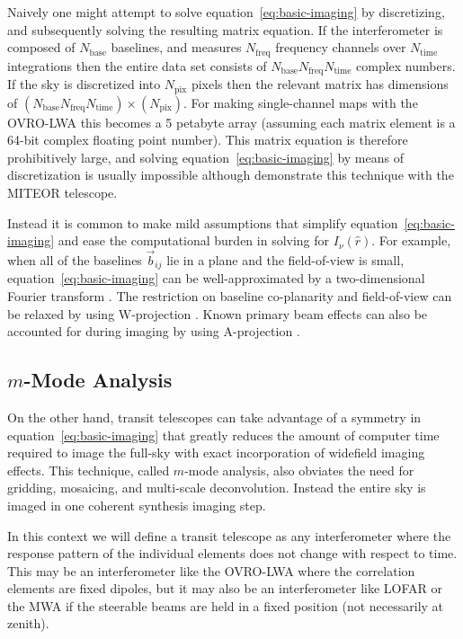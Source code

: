 \documentclass[twocolumn]{aastex6}
\begin{document}
Naively one might attempt to solve equation~\ref{eq:basic-imaging} by discretizing, and subsequently
solving the resulting matrix equation. If the interferometer is composed of $N_\text{base}$
baselines, and measures $N_\text{freq}$ frequency channels over $N_\text{time}$ integrations then
the entire data set consists of $N_\text{base}N_\text{freq}N_\text{time}$ complex numbers. If the
sky is discretized into $N_\text{pix}$ pixels then the relevant matrix has dimensions of
$(N_\text{base}N_\text{freq}N_\text{time})\times(N_\text{pix})$. For making single-channel maps with
the OVRO-LWA this becomes a 5 petabyte array (assuming each matrix element is a 64-bit complex
floating point number).  This matrix equation is therefore prohibitively large, and solving
equation~\ref{eq:basic-imaging} by means of discretization is usually impossible although
\citet{2017MNRAS.465.2901Z} demonstrate this technique with the MITEOR telescope.

Instead it is common to make mild assumptions that simplify equation~\ref{eq:basic-imaging} and ease
the computational burden in solving for $I_\nu(\hat r)$. For example, when all of the baselines
$\vec b_{ij}$ lie in a plane and the field-of-view is small, equation~\ref{eq:basic-imaging} can be
well-approximated by a two-dimensional Fourier transform \citep{2001isra.book.....T}. The
restriction on baseline co-planarity and field-of-view can be relaxed by using W-projection
\citep{2008ISTSP...2..647C}. Known primary beam effects can also be accounted for during imaging by
using A-projection \citep{2013ApJ...770...91B}.

\subsection{$m$-Mode Analysis}

On the other hand, transit telescopes can take advantage of a symmetry in
equation~\ref{eq:basic-imaging} that greatly reduces the amount of computer time required to image
the full-sky with exact incorporation of widefield imaging effects. This technique, called $m$-mode
analysis, also obviates the need for gridding, mosaicing, and multi-scale deconvolution. Instead the
entire sky is imaged in one coherent synthesis imaging step.

In this context we will define a transit telescope as any interferometer where the response pattern
of the individual elements does not change with respect to time. This may be an interferometer like
the OVRO-LWA where the correlation elements are fixed dipoles, but it may also be an interferometer
like LOFAR or the MWA if the steerable beams are held in a fixed position (not necessarily at
zenith).
\end{document}
